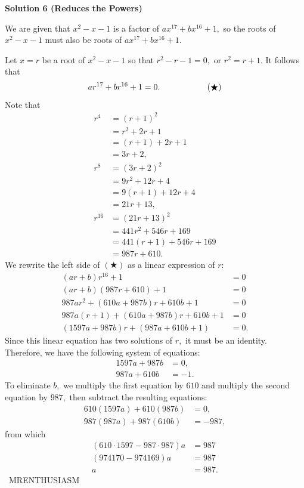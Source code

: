 \begin{enumerate}
 



\textbf{Solution 6 (Reduces the Powers)}

We are given that $x^2 - x - 1$ is a factor of $ax^{17} + bx^{16} + 1,$ so the roots of $x^2 - x - 1$ must also be roots of $ax^{17} + bx^{16} + 1.$

 Let $x=r$ be a root of $x^2 - x - 1$ so that $r^2 - r - 1 = 0,$ or $r^2 = r + 1.$ It follows that 
 \[ar^{17} + br^{16} + 1 = 0. \hspace{20mm} (\bigstar)\]Note that
 \begin{align*} r^4 &= (r+1)^2 \\ &= r^2 + 2r + 1 \\ &= (r+1) + 2r + 1 \\ &= 3r + 2, \\ r^8 &= (3r+2)^2 \\ &= 9r^2 + 12r + 4 \\ &= 9(r+1) + 12r + 4 \\ &= 21r + 13, \\ r^{16} &= (21r + 13)^2 \\ &= 441r^2 + 546r + 169 \\ &= 441(r+1) +546r + 169 \\ &= 987r + 610. \end{align*}
We rewrite the left side of $(\bigstar)$ as a linear expression of $r:$
 \begin{align*} (ar+b)r^{16} + 1 &= 0 \\ (ar+b)(987r + 610) + 1 &= 0 \\ 987ar^2 + (610a+987b)r + 610b + 1 &= 0 \\ 987a(r+1) + (610a+987b)r + 610b + 1 &= 0 \\ (1597a+987b)r + (987a + 610b + 1) &= 0.  \end{align*}
Since this linear equation has two solutions of $r,$ it must be an identity. Therefore, we have the following system of equations:
 \begin{align*} 1597a+987b &= 0, \\ 987a+610b &= -1. \end{align*}
To eliminate $b,$ we multiply the first equation by $610$ and multiply the second equation by $987,$ then subtract the resulting equations:
 \begin{align*} 610(1597a)+610(987b) &= 0, \\ 987(987a)+987(610b) &= -987, \end{align*}
from which
 \begin{align*} (610\cdot1597-987\cdot987)a&=987 \\ (974170-974169)a&=987 \\ a&=\boxed{987}. \end{align*}
~MRENTHUSIASM


\end{enumerate}
